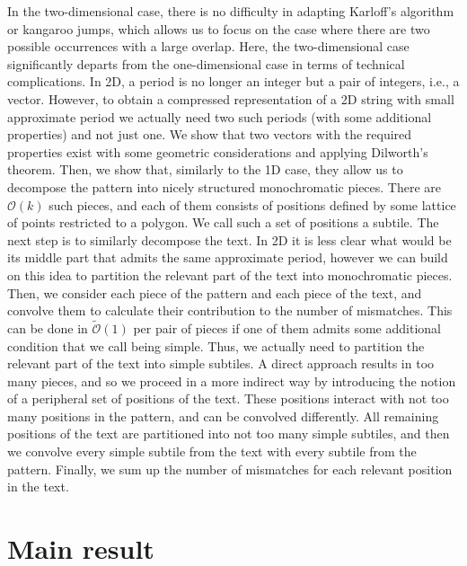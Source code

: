 \documentclass[11pt, letterpaper]{article}
\theoremstyle{plain}
\theoremstyle{definition}
\theoremstyle{remark}
\renewcommand{\O}{\mathcal{O}}
\newcommand{\tO}{\tilde{\mathcal{O}}}
\begin{document}
In the two-dimensional case, there is no difficulty in adapting Karloff's algorithm or kangaroo jumps, which allows
us to focus on the case where there are two possible occurrences with a large overlap. Here, the two-dimensional
case significantly departs from the one-dimensional case in terms of technical complications. In 2D, a period is
no longer an integer but a pair of integers, i.e., a vector. However, to obtain a compressed representation of
a 2D string with small approximate period we actually need two such periods (with some additional properties) and not
just one. We show that two vectors with the required properties exist with some geometric considerations and
applying Dilworth's theorem. Then, we show that, similarly to the 1D case, they allow us to decompose the pattern
into nicely structured monochromatic pieces. There are $\O(k)$ such pieces, and each of them consists of positions
defined by some lattice of points restricted to a polygon. We call such a set of positions a subtile.
The next step is to similarly decompose the text. In 2D it is less clear what would be its middle part that
admits the same approximate period, however we can build on this idea to partition the relevant part of the text
into monochromatic pieces. Then, we consider each piece of the pattern and each piece of the text,
and convolve them to calculate their contribution to the number of mismatches. This can be done in $\tO(1)$
per pair of pieces if one of them admits some additional condition that we call being simple.
Thus, we actually need to partition the relevant part of the text into simple subtiles. A direct approach
results in too many pieces, and so we proceed in a more indirect way by introducing the notion of
a peripheral set of positions of the text. These positions interact with not too many positions in the pattern,
and can be convolved differently. All remaining positions of the text are partitioned into not too many simple subtiles,
and then we convolve every simple subtile from the text with every subtile from the pattern.
Finally, we sum up the number of mismatches for each relevant position in the text.





\section{Main result}



\end{document}
